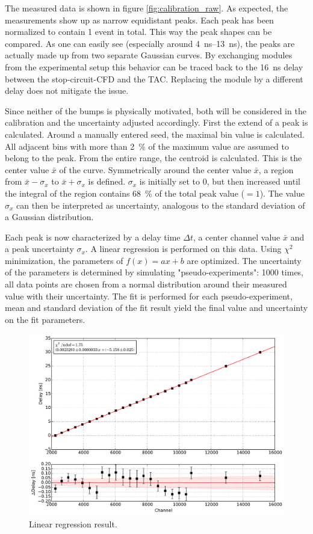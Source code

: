 \documentclass[
	paper=A4,
	parskip=full,
	chapterprefix=true,
	11pt,
	headings=normal,
	bibliography=totoc,
	listof=totoc,
	titlepage=on,
]{scrreprt}
\begin{document}
The measured data is shown in figure \ref{fig:calibration_raw}. As expected, the measurements show up as narrow equidistant peaks. Each peak has been normalized to contain \num{1} event in total. This way the peak shapes can be compared. As one can easily see (especially around \SIrange{4}{13}{\nano\second}), the peaks are actually made up from two separate Gaussian curves. By exchanging modules from the experimental setup this behavior can be traced back to the \SI{16}{\nano\second} delay between the stop-circuit-CFD and the TAC. Replacing the module by a different delay does not mitigate the issue.

Since neither of the bumps is physically motivated, both will be considered in the calibration and the uncertainty adjusted accordingly.
First the extend of a peak is calculated. Around a manually entered seed, the maximal bin value is calculated. All adjacent bins with more than \SI{2}{\percent} of the maximum value are assumed to belong to the peak. From the entire range, the centroid is calculated. This is the center value $\bar{x}$ of the curve. Symmetrically around the center value $\bar{x}$, a region from $\bar{x}-\sigma_x$ to $\bar{x}+\sigma_x$ is defined. $\sigma_x$ is initially set to \num{0}, but then increased until the integral of the region contains \SI{68}{\percent} of the total peak value ($ = \num{1}$). The value $\sigma_x$ can then be interpreted as uncertainty, analogous to the standard deviation of a Gaussian distribution.

Each peak is now characterized by a delay time $\Delta t$, a center channel value $\bar{x}$ and a peak uncertainty $\sigma_x$.
A linear regression is performed on this data. Using $\chi^2$ minimization, the parameters of $f(x) = a x + b$ are optimized. 
The uncertainty of the parameters is determined by simulating "pseudo-experiments": \num{1000} times, all data points are chosen from a normal distribution around their measured value with their uncertainty. The fit is performed for each pseudo-experiment, mean and standard deviation of the fit result yield the final value and uncertainty on the fit parameters.

\begin{figure}
	\centering
	\includegraphics{calibration}
	\caption{Linear regression result.}
	\label{fig:calibration_linreg}
\end{figure}
\end{document}
